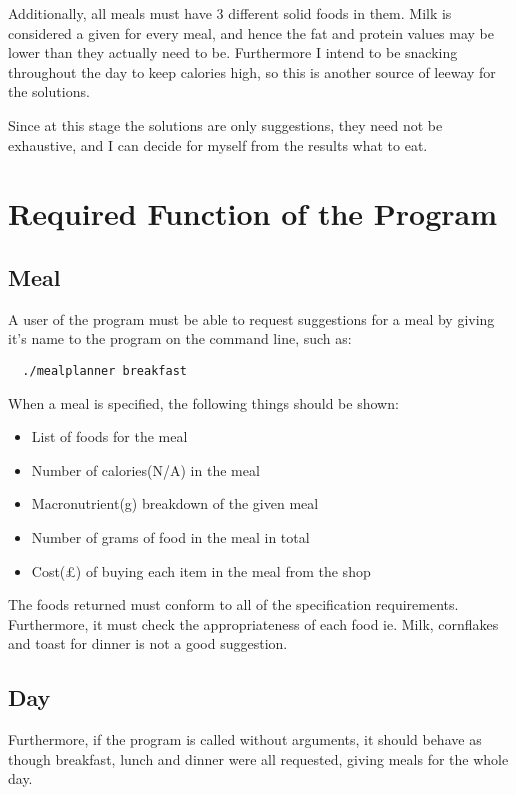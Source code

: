 \documentclass[a4paper]{article}
\begin{document}
Additionally, all meals must have 3 different solid foods in them. Milk 
is considered a given for every meal, and hence the fat and protein 
values may be lower than they actually need to be. Furthermore I intend 
to be snacking throughout the day to keep calories high, so this is 
another source of leeway for the solutions.

Since at this stage the solutions are only suggestions, they need not be 
exhaustive, and I can decide for myself from the results what to eat.

\section{Required Function of the Program}

\subsection{Meal}

A user of the program must be able to request suggestions for a meal by giving it's name 
to the program on the command line, such as:

\begin{verbatim}
  ./mealplanner breakfast
\end{verbatim}

When a meal is specified, the following things should be shown:

\begin{itemize}
  \item List of foods for the meal
  \item Number of calories(N/A) in the meal
  \item Macronutrient(g) breakdown of the given meal
  \item Number of grams of food in the meal in total
  \item Cost(£) of buying each item in the meal from the shop
\end{itemize}

The foods returned must conform to all of the specification 
requirements. Furthermore, it must check the appropriateness of each 
food ie. Milk, cornflakes and toast for dinner is not a good suggestion.

\subsection{Day}

Furthermore, if the program is called without arguments, it should 
behave as though breakfast, lunch and dinner were all requested, giving 
meals for the whole day.
\end{document}
